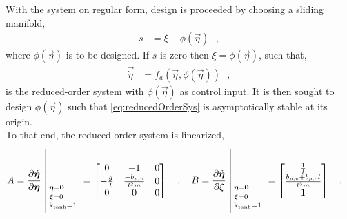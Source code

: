 %
%
%
%
%
%
%
%
%
%
With the system on regular form, design is proceeded by choosing a sliding manifold,
\begin{align}
s &=   \xi - \phi(\vec{\eta})    \ \ \ ,
\end{align}
where $\phi(\vec{\eta})$ is to be designed. If $s$ is zero then $\xi = \phi(\vec{\eta})$, such that,
\begin{align}
\vec{\dot{\eta}} &=  f_a(\vec{\eta},\phi(\vec{\eta}))     \ \ \ ,
\label{eq:reducedOrderSys}
\end{align}
is the reduced-order system with $\phi(\vec{\eta})$ as control input. It is then sought to design $\phi(\vec{\eta})$ such that \autoref{eq:reducedOrderSys} is asymptotically stable at its origin.\\
To that end, the reduced-order system is linearized,
%
\begin{align}
  A &= \frac{\partial \vec{\dot{\eta}}}{\partial \vec{\eta}} \whereThree{\vec{\eta}=\vec{0}\ \ \ \ }{\xi=0\ \ \ \ }{\text{k}_\text{tanh}=1} \ 
  =
  \begin{bmatrix}
    0           & -1                     & 0 \\
   -\frac{g}{l} & \frac{-b_{p,v}}{l^2 m} & 0 \\
    0           & 0                      & 0 
  \end{bmatrix}   \ \ \ , \ \ \
  B = \frac{\partial \vec{\dot{\eta}}}{\partial \xi} \whereThree{\vec{\eta}=\vec{0}\ \ \ \ }{\xi=0\ \ \ \ }{\text{k}_\text{tanh}=1} \ 
  =
  \begin{bmatrix}
    \frac{1}{l}                       \\
    \frac{b_{p,v} + b_{p,c} l}{l^3 m} \\
    1 
  \end{bmatrix}   \ \ \ .
  \label{eq:linearReducedOrder_A}
\end{align}
